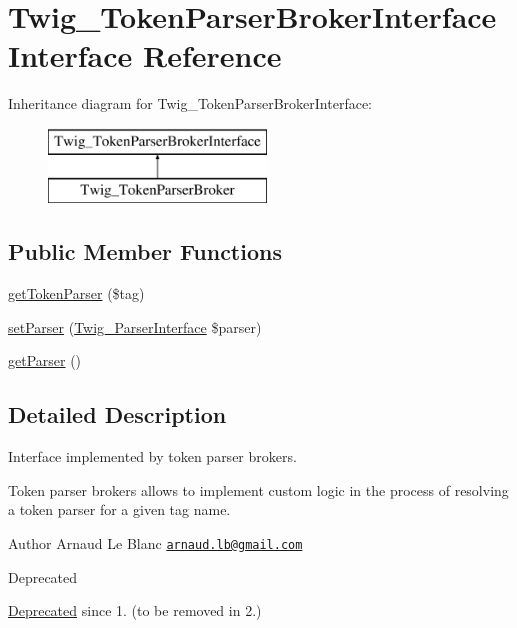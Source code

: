 \hypertarget{interfaceTwig__TokenParserBrokerInterface}{}\section{Twig\+\_\+\+Token\+Parser\+Broker\+Interface Interface Reference}
\label{interfaceTwig__TokenParserBrokerInterface}
Inheritance diagram for Twig\+\_\+\+Token\+Parser\+Broker\+Interface\+:\begin{figure}[H]
\begin{center}
\leavevmode
\includegraphics[height=2.000000cm]{interfaceTwig__TokenParserBrokerInterface}
\end{center}
\end{figure}
\subsection*{Public Member Functions}
\begin{DoxyCompactItemize}
\item 
\hyperlink{interfaceTwig__TokenParserBrokerInterface_a800c1cbd6416d5e45f969127726bf6ea}{get\+Token\+Parser} (\$tag)
\item 
\hyperlink{interfaceTwig__TokenParserBrokerInterface_a05273b4138208d161e6e5f0a645877a0}{set\+Parser} (\hyperlink{interfaceTwig__ParserInterface}{Twig\+\_\+\+Parser\+Interface} \$parser)
\item 
\hyperlink{interfaceTwig__TokenParserBrokerInterface_a4b5ef2d977fc3f901ad60fe382e0ea55}{get\+Parser} ()
\end{DoxyCompactItemize}


\subsection{Detailed Description}
Interface implemented by token parser brokers.

Token parser brokers allows to implement custom logic in the process of resolving a token parser for a given tag name.

\begin{DoxyAuthor}{Author}
Arnaud Le Blanc \href{mailto:arnaud.lb@gmail.com}{\tt arnaud.\+lb@gmail.\+com}
\end{DoxyAuthor}
\begin{DoxyRefDesc}{Deprecated}
\item[\hyperlink{deprecated__deprecated000044}{Deprecated}]since 1. (to be removed in 2.) \end{DoxyRefDesc}


